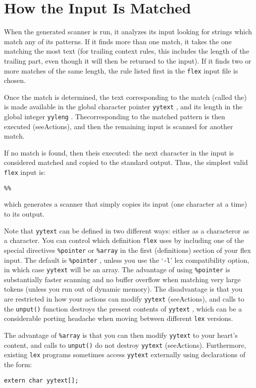 \documentclass[openany,oneside]{book}
\begin{document}
\chapter{How the Input Is Matched}


When the generated scanner is run, it analyzes its input looking for
strings which match any of its patterns.  If it finds more than one
match, it takes the one matching the most text (for trailing context
rules, this includes the length of the trailing part, even though it
will then be returned to the input).  If it finds two or more matches of
the same length, the rule listed first in the \verb`flex` input file is
chosen.

Once the match is determined, the text corresponding to the match
(called the) is made available in the global character
pointer \verb`yytext` , and its length in the global integer \verb`yyleng` .  Thecorresponding to the matched pattern is
then executed (seeActions), and then the remaining input is scanned
for another match.

If no match is found, then theis executed: the next
character in the input is considered matched and copied to the standard
output.  Thus, the simplest valid \verb`flex` input is:


\begin{verbatim}
%%
\end{verbatim}


which generates a scanner that simply copies its input (one character at
a time) to its output.

Note that \verb`yytext` can be defined in two different ways: either as
a characteror as a character. You can
control which definition \verb`flex` uses by including one of the
special directives \verb`%pointer` or \verb`%array` in the first
(definitions) section of your flex input.  The default is \verb`%pointer` , unless you use the ‘\verb`-l`’ lex compatibility option,
in which case \verb`yytext` will be an array.  The advantage of using \verb`%pointer` is substantially faster scanning and no buffer overflow
when matching very large tokens (unless you run out of dynamic memory). 
The disadvantage is that you are restricted in how your actions can
modify \verb`yytext` (seeActions), and calls to the \verb`unput()` function destroys the present contents of \verb`yytext` , which can be a
considerable porting headache when moving between different \verb`lex` versions.

The advantage of \verb`%array` is that you can then modify \verb`yytext` to your heart's content, and calls to \verb`unput()` do not destroy \verb`yytext` (seeActions).  Furthermore, existing \verb`lex` programs sometimes access \verb`yytext` externally using declarations of
the form:
\begin{verbatim}
extern char yytext[];
\end{verbatim}
\end{document}
